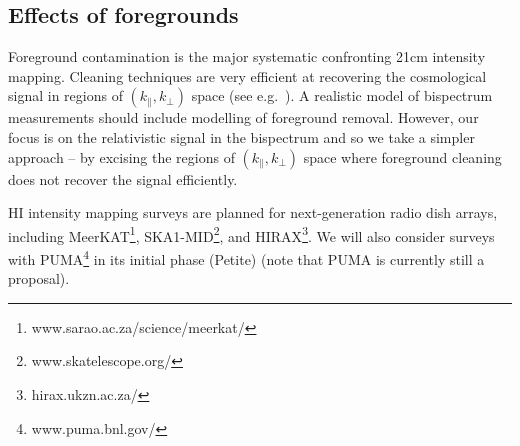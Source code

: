 \subsection{Effects of foregrounds}
%
Foreground contamination is the major systematic confronting 21cm intensity mapping. 
Cleaning techniques are very efficient at recovering the cosmological signal in regions of $(k_\|,k_\perp)$ space (see e.g.~\cite{Pober:2013jna, Bull:2014rha, Alonso:2014dhk, Pober:2014lva, Wolz:2015sqa, Santos:2015gra, Shaw:2014khi, Obuljen:2017jiy, Ansari:2018ury, Witzemann:2018cdx, Bacon:2018dui, Asorey:2020mxs, Cunnington:2020mnn}). A realistic model of bispectrum measurements should include modelling of foreground removal. However, our focus is on the relativistic signal in the bispectrum and so we take a simpler approach -- by excising the regions of $(k_\|,k_\perp)$ space where foreground cleaning does not recover the signal efficiently.

HI intensity mapping surveys are planned for next-generation radio dish arrays, including MeerKAT\footnote{www.sarao.ac.za/science/meerkat/}, SKA1-MID\footnote{{www.skatelescope.org/}}, and HIRAX\footnote{hirax.ukzn.ac.za/}. We will also consider surveys with
PUMA\footnote{{www.puma.bnl.gov/}} in its initial phase (Petite) (note that PUMA is currently still a proposal).

